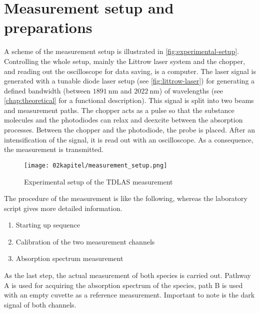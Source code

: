 \section{Measurement setup and preparations}
\label{sec:setup}

A scheme of the measurement setup is illustrated in \autoref{fig:experimental-setup}. Controlling the whole setup, mainly the Littrow laser system and the chopper, and reading out the oscilloscope for data saving, is a computer. The laser signal is generated with a tunable diode laser setup (see \autoref{fig:littrow-laser}) for generating a defined bandwidth (between $1891~\mathrm{nm}$ and $2022~\mathrm{nm}$) of wavelengths (see \autoref{chap:theoretical} for a functional description). This signal is split into two beams and measurement paths. The chopper acts as a pulse so that the substance molecules and the photodiodes can relax and deexcite between the absorption processes. Between the chopper and the photodiode, the probe is placed. After an intensification of the signal, it is read out with an oscilloscope. As a consequence, the measurement is transmitted. 

\begin{figure}[!htb]
    \centering
    \texttt{[image: 02kapitel/measurement\_setup.png]}
    \caption[Experimental setup of the TDLAS measurement]{Experimental setup of the TDLAS measurement \autocite{klevanskyTDLASTunableLaser2021}}
    \label{fig:experimental-setup}
\end{figure}

The procedure of the measurement is like the following, whereas the laboratory script \autocite{klevanskyTDLASTunableLaser2021} gives more detailed information.

\begin{enumerate}
    \item Starting up sequence
    \item Calibration of the two measurement channels
    \item Absorption spectrum measurement
\end{enumerate}
As the last step, the actual measurement of both species is carried out. Pathway A is used for acquiring the absorption spectrum of the species, path B is used with an empty cuvette as a reference measurement. Important to note is the dark signal of both channels.
\vspace{12pt}

